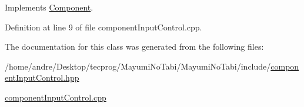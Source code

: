 Implements \hyperlink{class_component_a20c791684d452b36fcce40ac9038c735}{Component}.



Definition at line 9 of file component\-Input\-Control.\-cpp.



The documentation for this class was generated from the following files\-:\begin{DoxyCompactItemize}
\item 
/home/andre/\-Desktop/tecprog/\-Mayumi\-No\-Tabi/\-Mayumi\-No\-Tabi/include/\hyperlink{component_input_control_8hpp}{component\-Input\-Control.\-hpp}\item 
\hyperlink{component_input_control_8cpp}{component\-Input\-Control.\-cpp}\end{DoxyCompactItemize}
